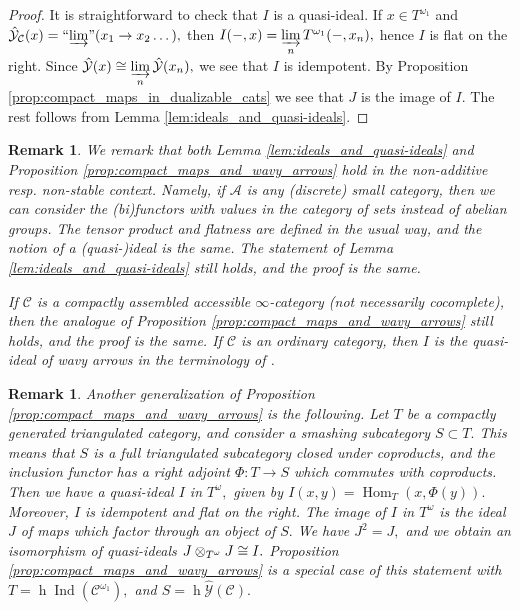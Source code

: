 \documentclass[11pt,leqno]{amsart}
\newtheorem{remark}[theo]{Remark}
\numberwithin{equation}{section}
\def\h{\operatorname{h}}
\def\Hom{\operatorname{Hom}}
\newcommand{\tens}[1]{%
  \mathbin{\mathop{\otimes}\displaylimits_{#1}}%
}
\newcommand{\indlim}[1][]{\mathop{\varinjlim}\limits_{#1}}
\newcommand{\inddlim}[1][]{{``{\indlim[#1]}"}}
\newcommand{\cA}{{\mathcal A}}
\newcommand{\cC}{{\mathcal C}}
\newcommand{\cY}{{\mathcal Y}}
\newcommand{\Ind}{\operatorname{Ind}}
\begin{document}
\begin{proof}It is straightforward to check that $I$ is a quasi-ideal. If $x\in T^{\omega_1}$ and $\hat{\cY}_{\cC}(x)=\inddlim[](x_1\to x_2\dots),$ then $I(-,x)=\indlim[n] T^{\omega_1}(-,x_n),$ hence $I$ is flat on the right. Since $\hat{\cY}(x)\cong\indlim[n]\hat{\cY}(x_n),$ we see that $I$ is idempotent. By Proposition \ref{prop:compact_maps_in_dualizable_cats} we see that $J$ is the image of $I.$ The rest follows from Lemma \ref{lem:ideals_and_quasi-ideals}.\end{proof}

\begin{remark}We remark that both Lemma \ref{lem:ideals_and_quasi-ideals} and Proposition \ref{prop:compact_maps_and_wavy_arrows} hold in the non-additive resp. non-stable context. Namely, if $\cA$ is any (discrete) small category, then we can consider the (bi)functors with values in the category of sets instead of abelian groups. The tensor product and flatness are defined in the usual way, and the notion of a (quasi-)ideal is the same. The statement of Lemma \ref{lem:ideals_and_quasi-ideals} still holds, and the proof is the same.

If $\cC$ is a compactly assembled accessible $\infty$-category (not necessarily cocomplete), then the analogue of Proposition \ref{prop:compact_maps_and_wavy_arrows} still holds, and the proof is the same. If $\cC$ is an ordinary category, then $I$ is the quasi-ideal of wavy arrows in the terminology of \cite[Section 2]{JJ}.\end{remark}

\begin{remark}Another generalization of Proposition \ref{prop:compact_maps_and_wavy_arrows} is the following. Let $T$ be a compactly generated triangulated category, and consider a smashing subcategory $S\subset T.$ This means that $S$ is a full triangulated subcategory closed under coproducts, and the inclusion functor has a right adjoint $\Phi:T\to S$ which commutes with coproducts. Then we have a quasi-ideal $I$ in $T^{\omega},$ given by $I(x,y)=\Hom_T(x,\Phi(y)).$ Moreover, $I$ is idempotent and flat on the right. The image of $I$ in $T^{\omega}$ is the ideal $J$ of maps which factor through an object of $S.$ We have $J^2=J,$ and we obtain an isomorphism of quasi-ideals $J\tens{T^{\omega}}J\cong I.$ Proposition \ref{prop:compact_maps_and_wavy_arrows} is a special case of this statement with $T=\h\Ind(\cC^{\omega_1}),$ and $S=\h\hat{\cY}(\cC).$\end{remark}
\end{document}
